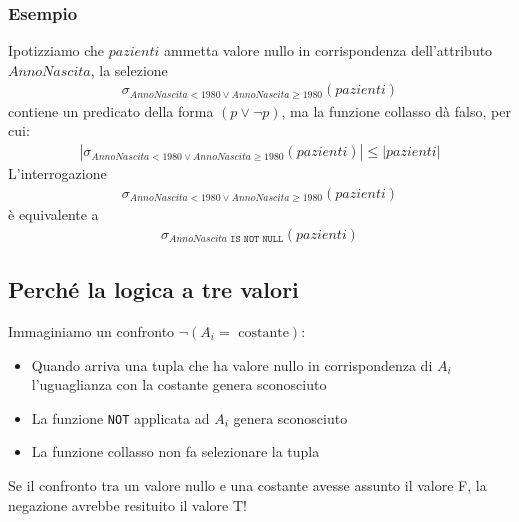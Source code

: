 \subsubsection{Esempio}
Ipotizziamo che $pazienti$ ammetta valore nullo in corrispondenza dell'attributo $AnnoNascita$, la selezione
    \begin{equation}\begin{aligned}
        \sigma_{AnnoNascita < 1980 \vee AnnoNascita \geq 1980} (pazienti)
    \end{aligned}\end{equation}
contiene un predicato della forma $(p \vee \neg p)$, ma la funzione collasso dà falso, per cui:
    \begin{equation}\begin{aligned}
        |\sigma_{AnnoNascita < 1980 \vee AnnoNascita \geq 1980} (pazienti)| \leq|pazienti|
    \end{aligned}\end{equation}
L'interrogazione 
    \begin{equation}\begin{aligned}
        \sigma_{AnnoNascita < 1980 \vee AnnoNascita \geq 1980} (pazienti)
    \end{aligned}\end{equation}
è equivalente a 
    \begin{equation}\begin{aligned}
        \sigma_{AnnoNascita \texttt{ IS NOT NULL}} (pazienti)
    \end{aligned}\end{equation}

\subsection{Perché la logica a tre valori}
Immaginiamo un confronto $\neg(A_i = \text{ costante})$:
    \begin{itemize}
        \item{Quando arriva una tupla che ha valore nullo in corrispondenza di $A_i$ l'uguaglianza con la costante genera sconosciuto}
        \item{La funzione \texttt{NOT} applicata ad $A_i$ genera sconosciuto}
        \item{La funzione collasso non fa selezionare la tupla}
    \end{itemize}
Se il confronto tra un valore nullo e una costante avesse assunto il valore F, la negazione avrebbe resituito il valore T!

